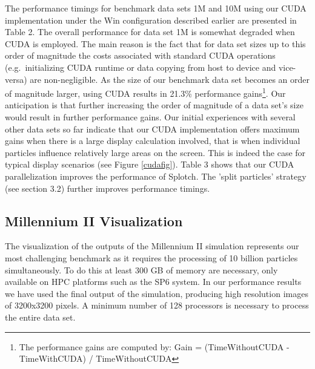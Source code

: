 \documentclass[1p,times]{elsarticle}
\begin{document}
The performance timings for benchmark data sets 1M and 10M using our CUDA
implementation under the Win configuration described earlier are presented in Table 2. 
The overall performance for data set 1M is somewhat degraded when CUDA is employed.
The main reason is the fact that for data set sizes up to this order of magnitude the
costs associated with standard CUDA operations (e.g.\ initializing CUDA runtime 
or data copying from host to device and vice-versa) are non-negligible. 
As the size of our benchmark data set becomes an order of magnitude larger,
using CUDA results in 21.3\% performance gains\footnote{The performance gains 
are computed by: Gain = (TimeWithoutCUDA - TimeWithCUDA) / TimeWithoutCUDA}. 
Our anticipation is that further increasing the order of magnitude of a data set's 
size would result in further performance gains. Our initial experiences with several 
other data sets so far indicate that our CUDA implementation offers maximum gains
when there is a large display calculation involved, that is when individual particles influence relatively large areas on the screen. This is indeed the case for typical display scenarios (see Figure \ref{cudafig}). Table 3 shows that our CUDA parallelization improves the 
performance of Splotch. The 'split particles' strategy (see section 3.2) further 
improves performance timings.
 

\subsection{Millennium II Visualization}
\label{mII}

The visualization of the outputs of the Millennium II simulation \cite{2009MNRAS.398.1150B} 
represents our most challenging benchmark as it requires the processing of 10 billion particles 
simultaneously. To do this at least 300 GB of memory are necessary, only available 
on HPC platforms such as the SP6 system.
In our performance results we have used the final output of the simulation, producing 
high resolution images of 3200x3200 pixels. A minimum number of 128 processors 
is necessary to process the entire data set.
\end{document}

